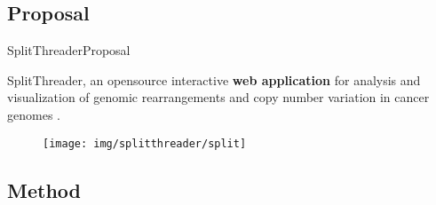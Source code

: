 \documentclass[10pt]{beamer}
\newcommand{\1}{
        	\setbeamertemplate{background}{
        		\texttt{[image: img/1\_BIO]}
        		\tikz[overlay] \fill[fill opacity=0.75,fill=white] (0,0) rectangle (-\paperwidth,\paperheight);
        	}
}
\begin{document}
\subsection{Proposal}

\begin{frame}{SplitThreader}{Proposal}	
	\begin{block}{}
		SplitThreader, an opensource interactive \textbf{web application} for analysis and visualization of genomic rearrangements and copy number	variation in cancer genomes \cite{nattestad2016splitthreader}.
	\end{block}	

	\begin{figure}
		\centering
		\texttt{[image: img/splitthreader/split]}
	\end{figure}	
\end{frame}


\subsection{Method}
\end{document}
